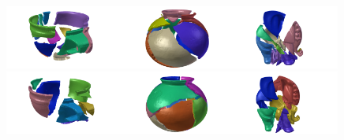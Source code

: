 \documentclass[acmlarge,screen]{acmart}
\begin{document}
\begin{figure}[h]
\includegraphics[width=0.33\textwidth]{images/ambercuppuzzle0}\includegraphics[width=0.33\textwidth]{images/saltdeanpuzzle0}\includegraphics[width=0.33\textwidth]{images/elephantpuzzle0}\\
\includegraphics[width=0.33\textwidth]{images/ambercuppuzzle2}\includegraphics[width=0.33\textwidth]{images/saltdeanpuzzle1}\includegraphics[width=0.33\textwidth]{images/elephantpuzzle1}\\

\end{figure}
\end{document}
